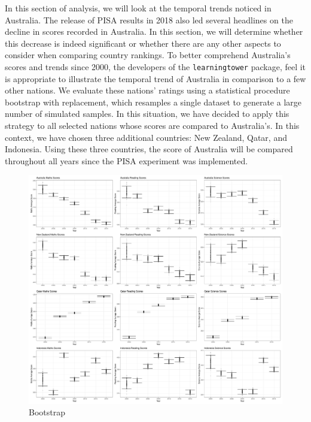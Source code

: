 In this section of analysis, we will look at the temporal trends noticed
in Australia. The release of PISA results in 2018 also led several
headlines on the decline in scores recorded in Australia. In this
section, we will determine whether this decrease is indeed significant
or whether there are any other aspects to consider when comparing
country rankings. To better comprehend Australia's scores and trends
since 2000, the developers of the \texttt{learningtower} package, feel
it is appropriate to illustrate the temporal trend of Australia in
comparison to a few other nations. We evaluate these nations' ratings
using a statistical procedure bootstrap with replacement, which
resamples a single dataset to generate a large number of simulated
samples. In this situation, we have decided to apply this strategy to
all selected nations whose scores are compared to Australia's. In this
context, we have chosen three additional countries: New Zealand, Qatar,
and Indonesia. Using these three countries, the score of Australia will
be compared throughout all years since the PISA experiment was
implemented.

\begin{Schunk}
\begin{figure}[H]
\includegraphics[width=1\linewidth]{learningtower_files/figure-latex/bs-plot-1} \caption[Bootstrap]{Bootstrap}\label{fig:bs-plot}
\end{figure}
\end{Schunk}

